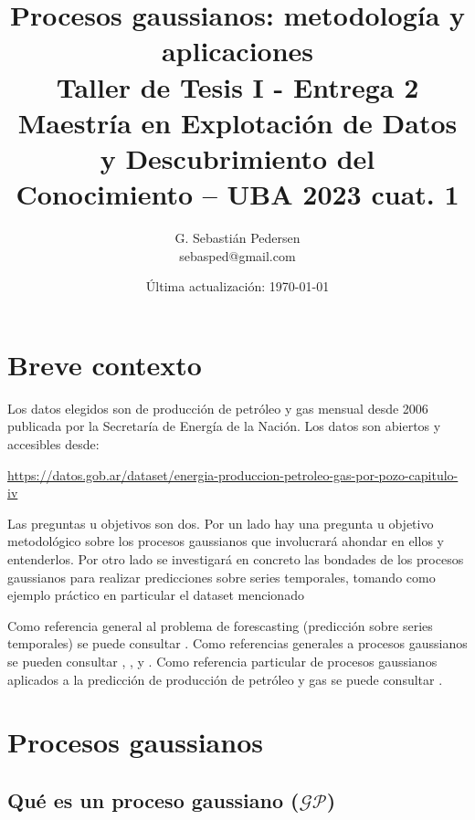 \documentclass[a4paper]{article}
\title{Procesos gaussianos: metodología y aplicaciones\\ Taller de Tesis I - Entrega 2\\ Maestría en Explotación de Datos y Descubrimiento del Conocimiento -- UBA 2023 cuat. 1}%
\author{G. Sebastián Pedersen \\ {\small sebasped@gmail.com}}
\date{Última actualización: \today}
\newcommand{\gp}{\ensuremath{\mathcal{GP}}}
\begin{document}

	
\maketitle

\tableofcontents	



\section{Breve contexto}
\label{breveContexto}
Los datos elegidos son de producción de petróleo y gas mensual desde 2006 publicada por la Secretaría de Energía de la Nación. Los datos son abiertos y accesibles desde: 

\url{https://datos.gob.ar/dataset/energia-produccion-petroleo-gas-por-pozo-capitulo-iv}

Las preguntas u objetivos son dos. Por un lado hay una pregunta u objetivo metodológico sobre los procesos gaussianos que involucrará ahondar en ellos y entenderlos. Por otro lado se investigará en concreto las bondades de los procesos gaussianos para realizar predicciones sobre series temporales, tomando como ejemplo práctico en particular el dataset mencionado

Como referencia general al problema de forescasting (predicción sobre series temporales) se puede consultar \cite{hyndman}. Como referencias generales a procesos gaussianos se pueden consultar \cite{gramacy}, \cite{tobar}, \cite{rasmussen} y \cite{murphy}. Como referencia particular de procesos gaussianos aplicados a la predicción de producción de petróleo y gas se puede consultar \cite{gppaper1}.




\section{Procesos gaussianos}

\subsection{Qué es un proceso gaussiano ($\gp$)}
\label{subsec:introGP}
\end{document}
